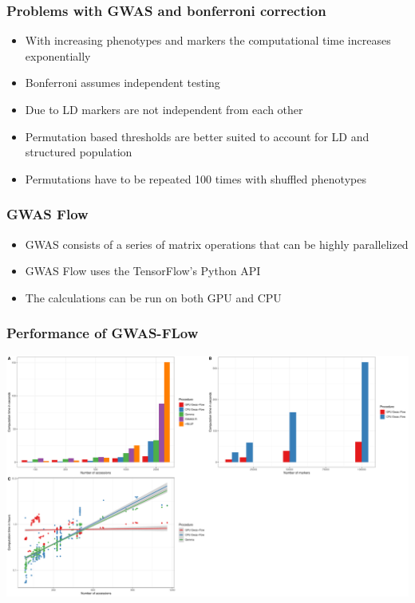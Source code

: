 \documentclass{beamer}
\begin{document}
\begin{frame}
  \frametitle{Problems with GWAS and bonferroni correction}
  \begin{itemize}[<+->]
  \item With increasing phenotypes and markers the computational time increases exponentially
  \item Bonferroni assumes independent testing
  \item Due to LD markers are not independent from each other
  \item Permutation based thresholds are better suited to account for LD and structured population
  \item Permutations have to be repeated 100 times with shuffled phenotypes
  \end{itemize}
\end{frame}

\begin{frame}
  \frametitle{GWAS Flow}
  \begin{itemize}[<+->]
  \item GWAS consists of a series of matrix operations that can be highly parallelized
  \item GWAS Flow uses the TensorFlow's Python API 
  \item The calculations can be run on both GPU and CPU 
  \end{itemize}
\end{frame}

\begin{frame}
  \frametitle{Performance of GWAS-FLow }
  \includegraphics[height=.8\textheight,width=.9\textwidth]{final_plot2.pdf}
\end{frame}





 
\end{document}
